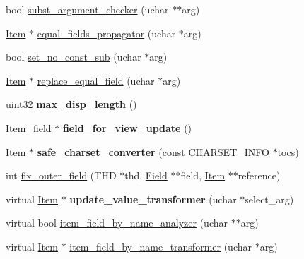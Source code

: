 \begin{DoxyCompactItemize}
\item 
bool \mbox{\hyperlink{classItem__field_a6d34c165aab5625fdac312326e3f1f56}{subst\+\_\+argument\+\_\+checker}} (uchar $\ast$$\ast$arg)
\item 
\mbox{\hyperlink{classItem}{Item}} $\ast$ \mbox{\hyperlink{classItem__field_af886c8bd34afb6700eabba7cb508866a}{equal\+\_\+fields\+\_\+propagator}} (uchar $\ast$arg)
\item 
bool \mbox{\hyperlink{classItem__field_a07f3871fa461313029a577362bb1d807}{set\+\_\+no\+\_\+const\+\_\+sub}} (uchar $\ast$arg)
\item 
\mbox{\hyperlink{classItem}{Item}} $\ast$ \mbox{\hyperlink{classItem__field_a35bd6ec29eb603e59823a3c42d67673c}{replace\+\_\+equal\+\_\+field}} (uchar $\ast$arg)
\item 
\mbox{\label{classItem__field_a64880ae3635e3440f28169f7757905b4}} 
uint32 {\bfseries max\+\_\+disp\+\_\+length} ()
\item 
\mbox{\label{classItem__field_a7a13ef843867fa32c119ecf01847fe66}} 
\mbox{\hyperlink{classItem__field}{Item\+\_\+field}} $\ast$ {\bfseries field\+\_\+for\+\_\+view\+\_\+update} ()
\item 
\mbox{\label{classItem__field_a2f1946fb34cc6a2331d7bb8c2477dec2}} 
\mbox{\hyperlink{classItem}{Item}} $\ast$ {\bfseries safe\+\_\+charset\+\_\+converter} (const C\+H\+A\+R\+S\+E\+T\+\_\+\+I\+N\+FO $\ast$tocs)
\item 
int \mbox{\hyperlink{classItem__field_a7db3f3b478fc70838cab2ce774242861}{fix\+\_\+outer\+\_\+field}} (T\+HD $\ast$thd, \mbox{\hyperlink{classField}{Field}} $\ast$$\ast$field, \mbox{\hyperlink{classItem}{Item}} $\ast$$\ast$reference)
\item 
\mbox{\label{classItem__field_a9165780f181bbaba9651ef58841dbdc3}} 
virtual \mbox{\hyperlink{classItem}{Item}} $\ast$ {\bfseries update\+\_\+value\+\_\+transformer} (uchar $\ast$select\+\_\+arg)
\item 
virtual bool \mbox{\hyperlink{classItem__field_aee675801bd0ba08e66d0210a597390de}{item\+\_\+field\+\_\+by\+\_\+name\+\_\+analyzer}} (uchar $\ast$$\ast$arg)
\item 
virtual \mbox{\hyperlink{classItem}{Item}} $\ast$ \mbox{\hyperlink{classItem__field_a6f22b76914e17709e6f3d8e894d8807d}{item\+\_\+field\+\_\+by\+\_\+name\+\_\+transformer}} (uchar $\ast$arg)

\end{DoxyCompactItemize}
